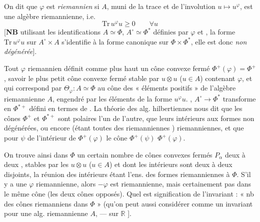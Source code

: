 \documentclass[11pt,a4paper]{article}
\begin{document}

On dit que  \struck{$\Phi$} $\varphi$ est
\struck{\ill{}} \emph{riemannien} si $A$, muni de la trace et de
l'involution $u \mapsto u^{\varphi}$, est une algèbre riemannienne, i.e.
\[
\mathrm{Tr}\, u^{\varphi} u \geqslant 0 \qquad \forall u
\]
\struck{\ill{}}
[\textbf{NB} utilisant les identifications $A \simeq \Phi$,
$A^{\circ} \simeq \Phi^{*}$ définies par $\varphi$ et
, la forme $\mathrm{Tr}\, u^{\varphi} u$
sur $A^{\circ} \times A$ s'identifie à la forme canonique sur
$\Phi \times \Phi^{*}$, elle est donc \emph{non dégénérée}].

Tout $\varphi$ riemannien définit comme plus haut un cône convexe fermé
$\Phi^{+}(\varphi) = \Phi^{+}$, savoir le plus petit cône convexe fermé
stable par $u \otimes u$ ($u \in A$) contenant $\varphi$, et qui correspond
par $\Theta_{\varphi} \colon A \simeq \Phi$ au cône des « éléments
positifs » de l'algèbre  riemannienne $A$, engendré par les
éléments de la forme $u^{\varphi} u$. ,
$A^{\circ} \to \Phi^{*}$ transforme \ill{} en \ill{} $\Phi^{*+}$ défini
en termes de . La théorie des alg.
hilbertiennes nous dit que les cônes $\Phi^{+}$ et $\Phi^{*+}$ sont
polaires l'un de l'autre, \struck{\ill{}} que leurs
intérieurs  aux formes \ill{} non dégénérées, ou
encore (étant toutes des riemanniennes \ill{}) riemanniennes, et que pour
 $\psi$ de l'intérieur de $\Phi^{+}(\varphi)$ le cône
$\Phi^{+}(\psi)$  $\Phi^{+}(\varphi)$.

On trouve ainsi dans $\Phi$ un certain nombre de cônes convexes fermés
$P_{\alpha}$ deux à deux , stables par les
$u \otimes u$ ($u \in A$) et dont les intérieurs sont deux à deux
disjoints, la réunion des intérieurs étant l'ens. des formes riemanniennes
 à $\Phi$.
S'il y a une $\varphi$ riemannienne, alors $-\varphi$ est riemannienne,
mais certainement pas dans le même cône (les deux cônes \ill{} opposés).
Quel est  signification de l'invariant : « nb des cônes
riemanniens dans $\Phi$ » (qu'on peut aussi considérer comme un invariant
pour une alg. riemannienne  $A$, — \ill{} sur $\mathbb{R}$
\ill{}].
\end{document}
